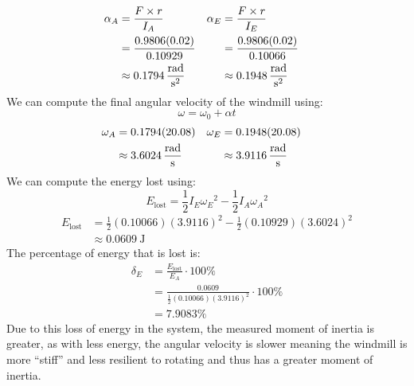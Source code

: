 \documentclass[article, 11pt]{article}
\begin{document}
    \begin{alignat*}{2}
        \begin{aligned}
            \alpha_A  &= \frac{F \times r}{I_A} \\
                      &= \frac{0.9806(0.02)}{0.10929} \\
                      &\approx \SI{0.1794}{\frac{\radian}{\second^2}}
        \end{aligned} \quad &
        \begin{aligned}
            \alpha_E &= \frac{F \times r}{I_E} \\
                     &= \frac{0.9806(0.02)}{0.10066} \\
                     &\approx \SI{0.1948}{\frac{\radian}{\second^2}}
        \end{aligned}
    \end{alignat*}
    We can compute the final angular velocity of the windmill using:
    \begin{equation*}
        \omega = \omega_0 + \alpha t
    \end{equation*}
    \begin{alignat*}{2}
        \begin{aligned}
            \omega_A &= 0.1794(20.08) \\
                     &\approx \SI{3.6024}{\frac{\radian}{\second}}
        \end{aligned} \quad &
        \begin{aligned}
            \omega_E &= 0.1948(20.08) \\
                     &\approx \SI{3.9116}{\frac{\radian}{\second}}
        \end{aligned}
    \end{alignat*}
    We can compute the energy lost using:
    \begin{equation*}
        E_\text{lost} = \frac{1}{2}I_E{\omega_E}^2 - \frac{1}{2}I_A{\omega_A}^2
    \end{equation*}
    \begin{align*}
        E_\text{lost} &= \frac{1}{2}(0.10066)(3.9116)^2 - \frac{1}{2}(0.10929)(3.6024)^2 \\
        &\approx \SI{0.0609}{\joule}
    \end{align*}
    The percentage of energy that is lost is:
    \begin{align*}
        \delta_E &= \frac{E_\text{lost}}{E_A} \cdot 100\% \\
                 &= \frac{0.0609}{\frac{1}{2}(0.10066)(3.9116)^2} \cdot 100\% \\
                 &= 7.9083\%
    \end{align*}
    Due to this loss of energy in the system, the measured moment of inertia is greater,
    as with less energy, the angular velocity is slower meaning the windmill is more
    ``stiff'' and less resilient to rotating and thus has a greater moment of inertia.
\end{document}
